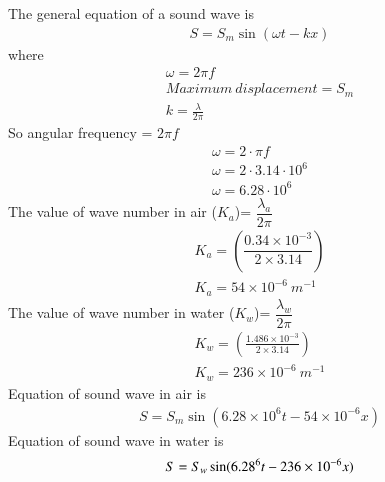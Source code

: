 \documentclass[journal,12pt,twocolumn]{IEEEtran}
\theoremstyle{remark}
\begin{document}
\begin{enumerate}
\begin{table}[htbp]
\centering

\vspace{0.5cm}
\caption{\normalsize $Results$}
\label{tab:parameters}
\end{table}
The general equation of a sound wave is
\begin{align}
S=S_m \sin (\omega t-kx)
\end{align}
where
\begin{align}
\omega = 2\pi f\\
Maximum \:displacement=S_m\\
k=\frac{\lambda}{2\pi}  
\end{align}
So angular frequency = $2\pi f$\\
\begin{align}
    \omega=2\cdot \pi f\\
    \omega=2\cdot 3.14 \cdot 10^{6}\\
    \omega=6.28 \cdot 10^{6}
\end{align}
The value of wave number in air ($K_a$)= $\dfrac{\lambda_a}{2 \pi}$
\begin{align}
    K_a=\left(\dfrac{0.34\times 10^{-3}}{2 \times 3.14 }\right)\\
    K_a=54 \times 10^{-6} \: m^{-1}
\end{align}
The value of wave number in water ($K_w$)= $\dfrac{\lambda_w}{2 \pi}$
\begin{align}
    K_w= \left(\frac{1.486 \times 10^{-3}}{2 \times 3.14}\right)\\
    K_w=236 \times 10^{-6} \: m^{-1}
\end{align}
Equation of sound wave in air is
\begin{align}
    S=S_m \sin (6.28 \times 10^{6} t-54\times 10^{-6}x)
\end{align}
Equation of sound wave in water is 
\begin{align}
    S=S_w \sin (6.28 \time 10^{6}t - 236 \times 10^{-6}x)
\end{align}
\end{enumerate}
\end{document}
